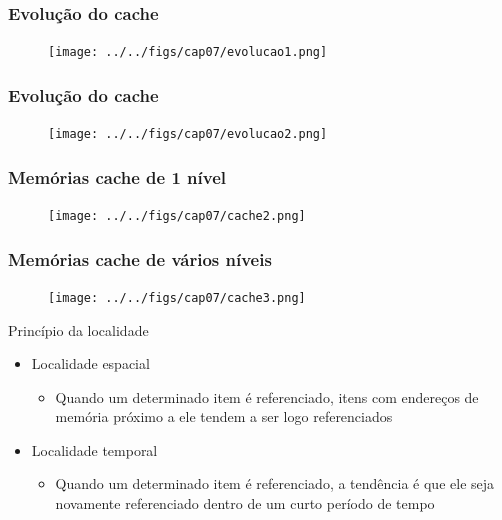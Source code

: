 \documentclass[aspectratio=169,
				xcolor=table]{beamer}
\begin{document}
	\begin{frame}
		\frametitle{Evolução do cache}
		
		\begin{figure}[hbtp]
			\centering
			\texttt{[image: ../../figs/cap07/evolucao1.png]}
		\end{figure}
	\end{frame}

	\begin{frame}
		\frametitle{Evolução do cache}
		
		\begin{figure}[hbtp]
			\centering
			\texttt{[image: ../../figs/cap07/evolucao2.png]}
		\end{figure}
	\end{frame}		
	
	\begin{frame}
		\frametitle{Memórias cache de 1 nível}
		\begin{figure}[hbtp]
			\centering
			\texttt{[image: ../../figs/cap07/cache2.png]}
		\end{figure}
	\end{frame}
	
	\begin{frame}
		\frametitle{Memórias cache de vários níveis}
		\begin{figure}[hbtp]
			\centering
			\texttt{[image: ../../figs/cap07/cache3.png]}
		\end{figure}
	\end{frame}

	\begin{frame}{Princípio da localidade}
		\begin{itemize}
			\item Localidade espacial
			\begin{itemize}
				\item Quando um determinado item é referenciado, itens com endereços de memória próximo a ele tendem a ser logo referenciados
			\end{itemize}
			\vspace{1em}
			\item Localidade temporal
			\begin{itemize}
				\item Quando um determinado item é referenciado, a tendência é que ele seja novamente referenciado dentro de um curto período de tempo
			\end{itemize}
		\end{itemize}
	\end{frame}
\end{document}
